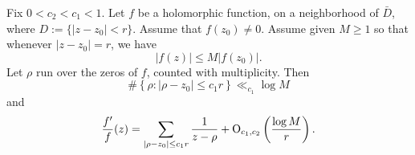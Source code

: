 \documentclass[reqno]{amsart} 
\begin{document}
\begin{lemma}\label{lemma:cj41z5hd4a}
  Fix $0 < c_2 < c_1 < 1$.  Let $f$ be a holomorphic function, on a neighborhood of $\bar{D}$, where $D := \{\lvert z - z_0 \rvert < r\}$.  Assume that $f(z_0) \neq 0$.  Assume given $M \geq 1$ so that whenever $|z - z_0| = r$, we have
  \begin{equation*}
    \lvert f(z) \rvert \leq M \lvert f(z_0) \rvert.
\end{equation*}
  Let $\rho$ run over the zeros of $f$, counted with multiplicity.  Then
  \begin{equation*}
    \# \left\{ \rho : \lvert \rho - z_0 \rvert \leq c_1 r \right\} \ll_{c_1} \log M
  \end{equation*}
  and
  \begin{equation*}
    \frac{f'}{f}(z) = \sum_{
      \lvert \rho - z_0 \rvert \leq c_1 r
    }
    \frac{1}{ z - \rho } + \operatorname{O}_{c_1, c_2} \left( \frac{\log M}{r} \right).
  \end{equation*}
\end{lemma}
\end{document}
